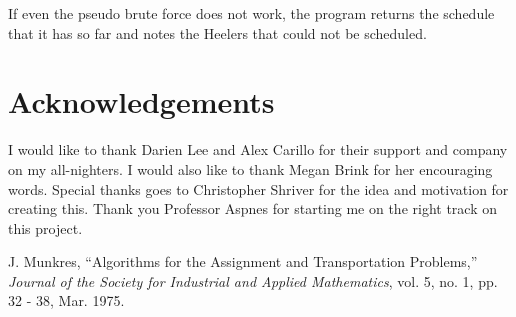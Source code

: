 \documentclass[letterpaper]{article}
\begin{document}
If even the pseudo brute force does not work, the program returns the schedule that it has so far and notes the Heelers
that could not be scheduled.





\section*{Acknowledgements}
I would like to thank Darien Lee and Alex Carillo for their support and company on my all-nighters. I would also like to
thank Megan Brink for her encouraging words. Special thanks goes to Christopher Shriver for the idea and motivation for
creating this. Thank you Professor Aspnes for starting me on the right track on this project.






\begin{thebibliography}{11}
       J. Munkres,
        ``Algorithms for the Assignment and Transportation Problems,''
        \emph{Journal of the Society for Industrial and Applied Mathematics},
        vol. 5, no. 1, pp. 32 - 38, Mar. 1975.
\end{thebibliography}
\end{document}
